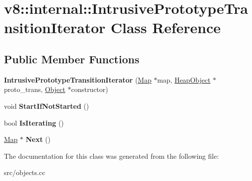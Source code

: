 \hypertarget{classv8_1_1internal_1_1_intrusive_prototype_transition_iterator}{}\section{v8\+:\+:internal\+:\+:Intrusive\+Prototype\+Transition\+Iterator Class Reference}
\label{classv8_1_1internal_1_1_intrusive_prototype_transition_iterator}
\subsection*{Public Member Functions}
\begin{DoxyCompactItemize}
\item 
\hypertarget{classv8_1_1internal_1_1_intrusive_prototype_transition_iterator_a01d6b3708366ff2fd15fffe590ed493f}{}{\bfseries Intrusive\+Prototype\+Transition\+Iterator} (\hyperlink{classv8_1_1internal_1_1_map}{Map} $\ast$map, \hyperlink{classv8_1_1internal_1_1_heap_object}{Heap\+Object} $\ast$proto\+\_\+trans, \hyperlink{classv8_1_1internal_1_1_object}{Object} $\ast$constructor)\label{classv8_1_1internal_1_1_intrusive_prototype_transition_iterator_a01d6b3708366ff2fd15fffe590ed493f}

\item 
\hypertarget{classv8_1_1internal_1_1_intrusive_prototype_transition_iterator_ae8ec5e684dddae8bbdaf249d4ff3a750}{}void {\bfseries Start\+If\+Not\+Started} ()\label{classv8_1_1internal_1_1_intrusive_prototype_transition_iterator_ae8ec5e684dddae8bbdaf249d4ff3a750}

\item 
\hypertarget{classv8_1_1internal_1_1_intrusive_prototype_transition_iterator_ad04e6ad5baa63ab4c66ef62d1e6443e4}{}bool {\bfseries Is\+Iterating} ()\label{classv8_1_1internal_1_1_intrusive_prototype_transition_iterator_ad04e6ad5baa63ab4c66ef62d1e6443e4}

\item 
\hypertarget{classv8_1_1internal_1_1_intrusive_prototype_transition_iterator_ab7013c88c2874037ce47e2c8f237facc}{}\hyperlink{classv8_1_1internal_1_1_map}{Map} $\ast$ {\bfseries Next} ()\label{classv8_1_1internal_1_1_intrusive_prototype_transition_iterator_ab7013c88c2874037ce47e2c8f237facc}

\end{DoxyCompactItemize}


The documentation for this class was generated from the following file\+:\begin{DoxyCompactItemize}
\item 
src/objects.\+cc\end{DoxyCompactItemize}
